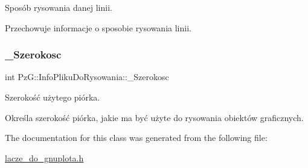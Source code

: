 Sposób rysowania danej linii. 

Przechowuje informacje o sposobie rysowania linii. \mbox{\label{classPzG_1_1InfoPlikuDoRysowania_a56a03dde7a7a414dbf3c230812a8d741}} 
\subsubsection{\texorpdfstring{\+\_\+\+Szerokosc}{\_Szerokosc}}
{\footnotesize\ttfamily int Pz\+G\+::\+Info\+Pliku\+Do\+Rysowania\+::\+\_\+\+Szerokosc\hspace{0.3cm}{\ttfamily [private]}}



Szerokość użytego piórka. 

Określa szerokość piórka, jakie ma być użyte do rysowania obiektów graficznych. 

The documentation for this class was generated from the following file\+:\begin{DoxyCompactItemize}
\item 
\hyperlink{lacze__do__gnuplota_8h}{lacze\+\_\+do\+\_\+gnuplota.\+h}\end{DoxyCompactItemize}

